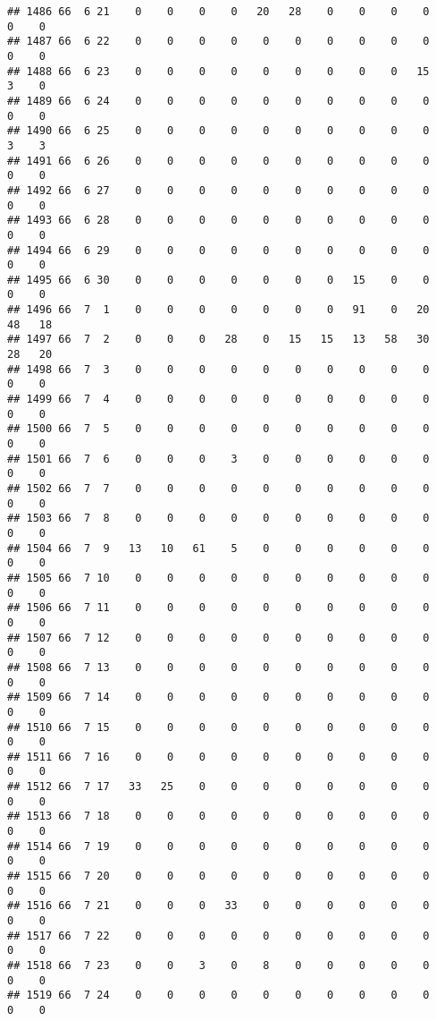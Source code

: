 \documentclass[]{article}
\begin{document}
\begin{verbatim}
## 1486 66  6 21    0    0    0    0   20   28    0    0    0    0    0    0
## 1487 66  6 22    0    0    0    0    0    0    0    0    0    0    0    0
## 1488 66  6 23    0    0    0    0    0    0    0    0    0   15    3    0
## 1489 66  6 24    0    0    0    0    0    0    0    0    0    0    0    0
## 1490 66  6 25    0    0    0    0    0    0    0    0    0    0    3    3
## 1491 66  6 26    0    0    0    0    0    0    0    0    0    0    0    0
## 1492 66  6 27    0    0    0    0    0    0    0    0    0    0    0    0
## 1493 66  6 28    0    0    0    0    0    0    0    0    0    0    0    0
## 1494 66  6 29    0    0    0    0    0    0    0    0    0    0    0    0
## 1495 66  6 30    0    0    0    0    0    0    0   15    0    0    0    0
## 1496 66  7  1    0    0    0    0    0    0    0   91    0   20   48   18
## 1497 66  7  2    0    0    0   28    0   15   15   13   58   30   28   20
## 1498 66  7  3    0    0    0    0    0    0    0    0    0    0    0    0
## 1499 66  7  4    0    0    0    0    0    0    0    0    0    0    0    0
## 1500 66  7  5    0    0    0    0    0    0    0    0    0    0    0    0
## 1501 66  7  6    0    0    0    3    0    0    0    0    0    0    0    0
## 1502 66  7  7    0    0    0    0    0    0    0    0    0    0    0    0
## 1503 66  7  8    0    0    0    0    0    0    0    0    0    0    0    0
## 1504 66  7  9   13   10   61    5    0    0    0    0    0    0    0    0
## 1505 66  7 10    0    0    0    0    0    0    0    0    0    0    0    0
## 1506 66  7 11    0    0    0    0    0    0    0    0    0    0    0    0
## 1507 66  7 12    0    0    0    0    0    0    0    0    0    0    0    0
## 1508 66  7 13    0    0    0    0    0    0    0    0    0    0    0    0
## 1509 66  7 14    0    0    0    0    0    0    0    0    0    0    0    0
## 1510 66  7 15    0    0    0    0    0    0    0    0    0    0    0    0
## 1511 66  7 16    0    0    0    0    0    0    0    0    0    0    0    0
## 1512 66  7 17   33   25    0    0    0    0    0    0    0    0    0    0
## 1513 66  7 18    0    0    0    0    0    0    0    0    0    0    0    0
## 1514 66  7 19    0    0    0    0    0    0    0    0    0    0    0    0
## 1515 66  7 20    0    0    0    0    0    0    0    0    0    0    0    0
## 1516 66  7 21    0    0    0   33    0    0    0    0    0    0    0    0
## 1517 66  7 22    0    0    0    0    0    0    0    0    0    0    0    0
## 1518 66  7 23    0    0    3    0    8    0    0    0    0    0    0    0
## 1519 66  7 24    0    0    0    0    0    0    0    0    0    0    0    0

\end{verbatim}
\end{document}
